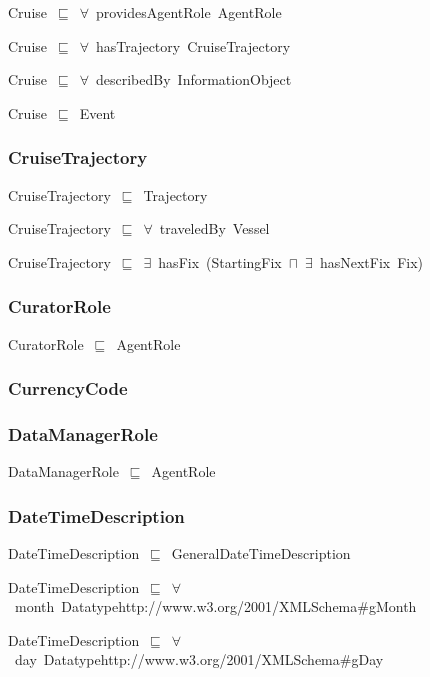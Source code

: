 \documentclass{article}
\begin{document}
Cruise~\ensuremath{\sqsubseteq}~\ensuremath{\forall}~providesAgentRole~AgentRole~

Cruise~\ensuremath{\sqsubseteq}~\ensuremath{\forall}~hasTrajectory~CruiseTrajectory~

Cruise~\ensuremath{\sqsubseteq}~\ensuremath{\forall}~describedBy~InformationObject~

Cruise~\ensuremath{\sqsubseteq}~Event~

\subsubsection*{CruiseTrajectory}

CruiseTrajectory~\ensuremath{\sqsubseteq}~Trajectory~

CruiseTrajectory~\ensuremath{\sqsubseteq}~\ensuremath{\forall}~traveledBy~Vessel~

CruiseTrajectory~\ensuremath{\sqsubseteq}~\ensuremath{\exists}~hasFix~(StartingFix~\ensuremath{\sqcap}~\ensuremath{\exists}~hasNextFix~Fix)~

\subsubsection*{CuratorRole}

CuratorRole~\ensuremath{\sqsubseteq}~AgentRole~

\subsubsection*{CurrencyCode}

\subsubsection*{DataManagerRole}

DataManagerRole~\ensuremath{\sqsubseteq}~AgentRole~

\subsubsection*{DateTimeDescription}

DateTimeDescription~\ensuremath{\sqsubseteq}~GeneralDateTimeDescription~

DateTimeDescription~\ensuremath{\sqsubseteq}~\ensuremath{\forall}~month~Datatypehttp://www.w3.org/2001/XMLSchema#gMonth~

DateTimeDescription~\ensuremath{\sqsubseteq}~\ensuremath{\forall}~day~Datatypehttp://www.w3.org/2001/XMLSchema#gDay~
\end{document}
